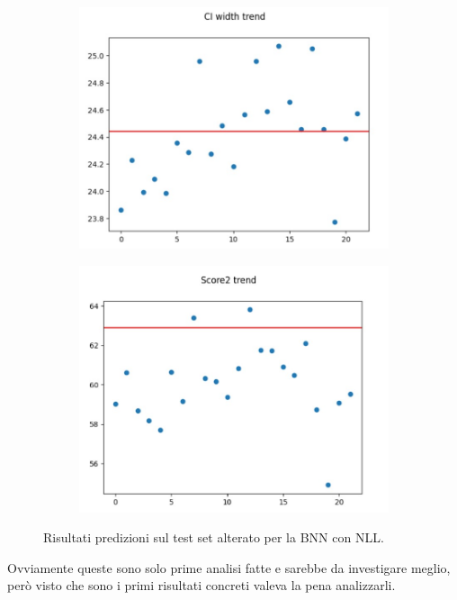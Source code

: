 \documentclass[
	letterpaper,
	a4paper,
	cleardoublepage=empty,
	headings=twolinechapter,
	numbers=autoenddot,
]{article}
\begin{document}
\begin{figure}[h]
		\begin{subfigure}{.5\textwidth}
			\centering
			\includegraphics[width=0.7\linewidth]{ImageFiles/nll_bnn_ci}
			\caption{}
			\label{fig:nll_bnn_ci}
		\end{subfigure}%
		\begin{subfigure}{.5\textwidth}
			\centering
			\includegraphics[width=0.7\linewidth]{ImageFiles/nll_bnn_eff2}
			\caption{}
			\label{fig:nll_bnn_eff2}
		\end{subfigure}
		\caption{Risultati predizioni sul test set alterato per la BNN con NLL.}
		\label{fig:nll_bnn}
	\end{figure}

	Ovviamente queste sono solo prime analisi fatte e sarebbe da investigare meglio, però visto che sono i primi risultati concreti valeva la pena analizzarli.
	
\end{document}
